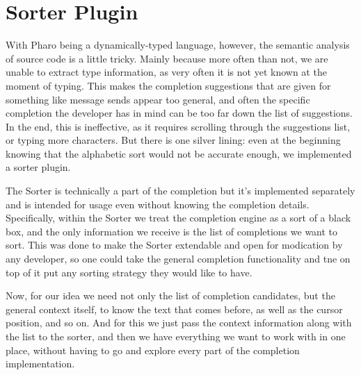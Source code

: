 \section{Sorter Plugin}
With Pharo being a dynamically-typed language, however, the semantic analysis of source code is a little tricky. Mainly because more often than not, we are unable to extract type information, as very often it is not yet known at the moment of typing. This makes the completion suggestions that are given for something like message sends appear too general, and often the specific completion the developer has in mind can be too far down the list of suggestions. In the end, this is ineffective, as it requires scrolling through the suggestions list, or typing more characters. But there is one silver lining: even at the beginning knowing that the alphabetic sort would not be accurate enough, we implemented a sorter plugin.

The Sorter is technically a part of the completion but it's implemented separately and is intended for usage even without knowing the completion details. Specifically, within the Sorter we treat the completion engine as a sort of a black box, and the only information we receive is the list of completions we want to sort. This was done to make the Sorter extendable and open for modication by any developer, so one could take the general completion functionality and tne on top of it put any sorting strategy they would like to have.

Now, for our idea we need not only the list of completion candidates, but the general context itself, to know the text that comes before, as well as the cursor position, and so on. And for this we just pass the context information along with the list to the sorter, and then we have everything we want to work with in one place, without having to go and explore every part of the completion implementation.
